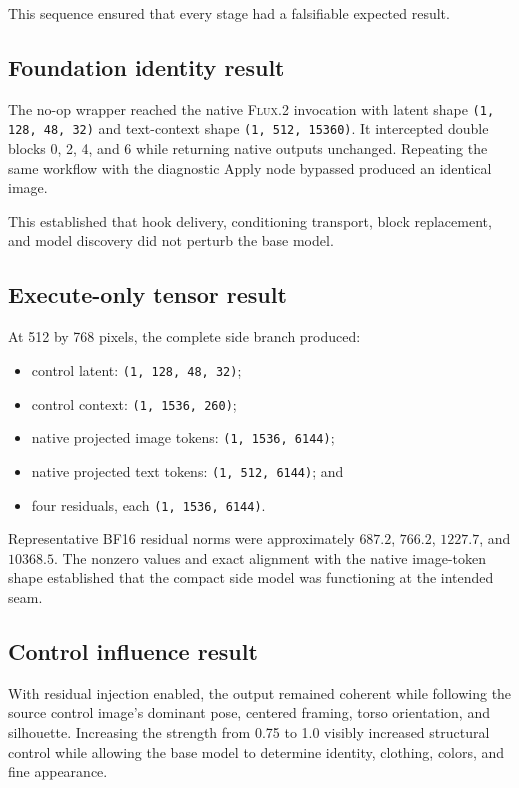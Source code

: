 \documentclass[11pt]{article}
\newcommand{\FluxTwo}{\textsc{Flux.2}}
\newcommand{\code}[1]{\texttt{#1}}
\begin{document}
This sequence ensured that every stage had a falsifiable expected result.

\subsection{Foundation identity result}

The no-op wrapper reached the native \FluxTwo{} invocation with latent shape
\code{(1, 128, 48, 32)} and text-context shape
\code{(1, 512, 15360)}. It intercepted double blocks 0, 2, 4, and 6 while returning native outputs unchanged. Repeating the same workflow with the diagnostic Apply node bypassed produced an identical image.

This established that hook delivery, conditioning transport, block replacement, and model discovery did not perturb the base model.

\subsection{Execute-only tensor result}

At 512 by 768 pixels, the complete side branch produced:

\begin{itemize}
  \item control latent: \code{(1, 128, 48, 32)};
  \item control context: \code{(1, 1536, 260)};
  \item native projected image tokens: \code{(1, 1536, 6144)};
  \item native projected text tokens: \code{(1, 512, 6144)}; and
  \item four residuals, each \code{(1, 1536, 6144)}.
\end{itemize}

Representative BF16 residual norms were approximately
$687.2$, $766.2$, $1227.7$, and $10368.5$. The nonzero values and exact alignment with the native image-token shape established that the compact side model was functioning at the intended seam.

\subsection{Control influence result}

With residual injection enabled, the output remained coherent while following the source control image's dominant pose, centered framing, torso orientation, and silhouette. Increasing the strength from 0.75 to 1.0 visibly increased structural control while allowing the base model to determine identity, clothing, colors, and fine appearance.
\end{document}
